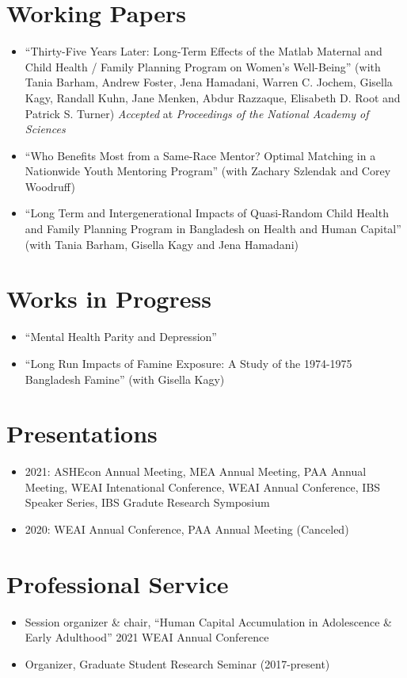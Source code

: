 \documentclass[letterpaper]{article}
\begin{document}
\section*{Working Papers}
\begin{itemize}
	\item ``Thirty-Five Years Later: Long-Term Effects of the Matlab Maternal and Child Health / Family Planning Program on Women's Well-Being'' (with Tania Barham, Andrew Foster, Jena Hamadani, Warren C. Jochem, Gisella Kagy, Randall Kuhn, Jane Menken, Abdur Razzaque, Elisabeth D. Root and Patrick S. Turner) \textit{Accepted} at \textit{Proceedings of the National Academy of Sciences}
	\item ``Who Benefits Most from a Same-Race Mentor? Optimal Matching in a Nationwide Youth Mentoring Program'' (with Zachary Szlendak and Corey Woodruff)
	\item ``Long Term and Intergenerational Impacts of Quasi-Random Child Health and Family Planning Program in Bangladesh on Health and Human Capital'' (with Tania Barham, Gisella Kagy and Jena Hamadani)
	
\end{itemize}

\section*{Works in Progress}
\begin{itemize}
	\item ``Mental Health Parity and Depression''
	\item ``Long Run Impacts of Famine Exposure: A Study of the 1974-1975 Bangladesh Famine'' (with Gisella Kagy)
\end{itemize}

\section*{Presentations}
\begin{itemize}
	\item[] 2021: ASHEcon Annual Meeting, MEA Annual Meeting, PAA Annual Meeting, WEAI Intenational Conference, WEAI Annual Conference, IBS Speaker Series, IBS Gradute Research Symposium
	\item[] 2020: WEAI Annual Conference, PAA Annual Meeting (Canceled)
\end{itemize}

\section*{Professional Service}
\begin{itemize}
	\item[] Session organizer \& chair, ``Human Capital Accumulation in Adolescence \& Early Adulthood'' 2021 WEAI Annual Conference 
	\item[] Organizer, Graduate Student Research Seminar (2017-present)
\end{itemize}
\end{document}
